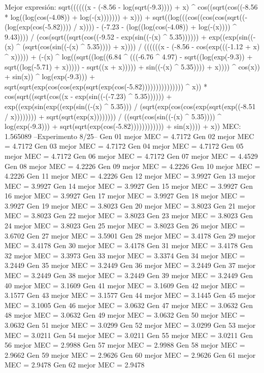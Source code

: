 Mejor expresión: sqrt((((((x - (-8.56 - log(sqrt(-9.3)))) + x) ^ cos((sqrt(cos((-8.56 * log((log(cos(-4.08)) + log(-(x))))))) + x))) + sqrt((log(((cos((cos(cos(sqrt((-(log(exp(cos(-5.82)))) / x)))) - (-7.23 - (log((log(cos(-4.08)) + log(-(x)))) ^ 9.43)))) / (cos(sqrt((sqrt(cos((-9.52 - exp(sin((-(x) ^ 5.35)))))) + exp((exp(sin((-(x) ^ (sqrt(cos(sin((-(x) ^ 5.35)))) + x)))) / ((((((x - (-8.56 - cos(exp(((-1.12 + x) ^ x))))) + (-(x) ^ log((sqrt((log((6.84 ^ (((-6.76 ^ 4.97) - sqrt((log(exp(-9.3)) + sqrt((log(-5.71) + x))))) - sqrt((x + x))))) + sin((-(x) ^ 5.35)))) + x)))) ^ cos(x)) + sin(x)) ^ log(exp(-9.3))) + sqrt(sqrt(exp(cos(cos(exp(sqrt(exp(cos(-5.82))))))))))))))) ^ x)) * cos(sqrt((sqrt(cos((x - exp(sin((-(-7.23) ^ 5.35)))))) + exp((exp(sin(exp((exp(sin((-(x) ^ 5.35))) / (sqrt(exp(cos(cos(exp(sqrt(exp((-8.51 / x)))))))) + sqrt(sqrt(exp(x)))))))) / ((sqrt(cos(sin((-(x) ^ 5.35)))) ^ log(exp(-9.3))) + sqrt(sqrt(exp(cos(-5.82)))))))))))) + sin(x)))) + x))
MEC: 1.565089
--Experimento 
 8/25--
Gen 01 mejor MEC = 4.7172
Gen 02 mejor MEC = 4.7172
Gen 03 mejor MEC = 4.7172
Gen 04 mejor MEC = 4.7172
Gen 05 mejor MEC = 4.7172
Gen 06 mejor MEC = 4.7172
Gen 07 mejor MEC = 4.4529
Gen 08 mejor MEC = 4.2226
Gen 09 mejor MEC = 4.2226
Gen 10 mejor MEC = 4.2226
Gen 11 mejor MEC = 4.2226
Gen 12 mejor MEC = 3.9927
Gen 13 mejor MEC = 3.9927
Gen 14 mejor MEC = 3.9927
Gen 15 mejor MEC = 3.9927
Gen 16 mejor MEC = 3.9927
Gen 17 mejor MEC = 3.9927
Gen 18 mejor MEC = 3.9927
Gen 19 mejor MEC = 3.8023
Gen 20 mejor MEC = 3.8023
Gen 21 mejor MEC = 3.8023
Gen 22 mejor MEC = 3.8023
Gen 23 mejor MEC = 3.8023
Gen 24 mejor MEC = 3.8023
Gen 25 mejor MEC = 3.8023
Gen 26 mejor MEC = 3.6702
Gen 27 mejor MEC = 3.5901
Gen 28 mejor MEC = 3.4178
Gen 29 mejor MEC = 3.4178
Gen 30 mejor MEC = 3.4178
Gen 31 mejor MEC = 3.4178
Gen 32 mejor MEC = 3.3973
Gen 33 mejor MEC = 3.3374
Gen 34 mejor MEC = 3.2449
Gen 35 mejor MEC = 3.2449
Gen 36 mejor MEC = 3.2449
Gen 37 mejor MEC = 3.2449
Gen 38 mejor MEC = 3.2449
Gen 39 mejor MEC = 3.2449
Gen 40 mejor MEC = 3.1609
Gen 41 mejor MEC = 3.1609
Gen 42 mejor MEC = 3.1577
Gen 43 mejor MEC = 3.1577
Gen 44 mejor MEC = 3.1445
Gen 45 mejor MEC = 3.1005
Gen 46 mejor MEC = 3.0632
Gen 47 mejor MEC = 3.0632
Gen 48 mejor MEC = 3.0632
Gen 49 mejor MEC = 3.0632
Gen 50 mejor MEC = 3.0632
Gen 51 mejor MEC = 3.0299
Gen 52 mejor MEC = 3.0299
Gen 53 mejor MEC = 3.0211
Gen 54 mejor MEC = 3.0211
Gen 55 mejor MEC = 3.0211
Gen 56 mejor MEC = 2.9988
Gen 57 mejor MEC = 2.9988
Gen 58 mejor MEC = 2.9662
Gen 59 mejor MEC = 2.9626
Gen 60 mejor MEC = 2.9626
Gen 61 mejor MEC = 2.9478
Gen 62 mejor MEC = 2.9478
